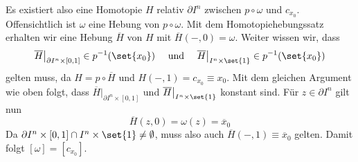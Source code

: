 \begin{description}
	Es existiert also eine Homotopie $H$ relativ $\partial I^n$ zwischen $p \circ \omega$ und $c_{x_0}$. 
	Offensichtlich ist $\omega$ eine Hebung von $p \circ \omega$. 
	Mit dem Homotopiehebungssatz erhalten wir eine Hebung $\overline{H}$ von $H$ mit $\overline{H}(-,0) = \omega$. 
	Weiter wissen wir, dass
	\[
		\overline{H} \big|_{\partial I^n \times [0,1]} \in p ^{-1}(\set{x_0} ) \quad \text{ und }\quad  \overline{H} \big|_{ I^n \times \set{1}} \in p ^{-1}(\set{x_0} )
	\]
	gelten muss, da $H = p \circ \overline{H}$ und $H(-,1)= c_{x_0} \equiv x_0$. 
	Mit dem gleichen Argument wie oben folgt, dass $\overline{H} \big|_{\partial I^n \times [0,1]}$ und $\overline{H} \big|_{ I^n \times \set{1}}$ konstant sind. 
	Für $z \in \partial I^n$ gilt nun
	\[
		\overline{H}(z,0) = \omega(z) = \overline{x}_0
	\]
	Da $\partial I^n \times [0,1] \cap I^n \times \set{1} \not= \emptyset$, muss also auch $\overline{H}(-,1) \equiv \overline{x}_0$ gelten. 
	Damit folgt $[\omega] = [c_{x_0}]$.\qedhere
\end{description}